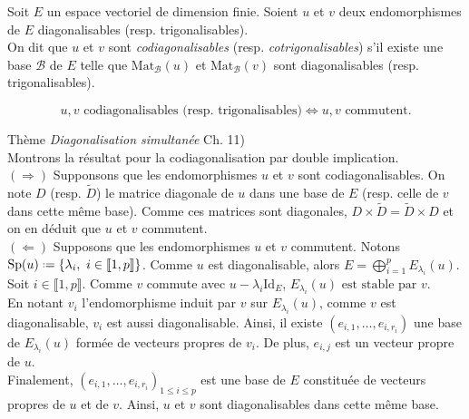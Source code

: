 \begin{defi}
    Soit $E$ un espace vectoriel de dimension finie. Soient $u$ et $v$ deux endomorphismes de $E$ diagonalisables (resp. trigonalisables). \\
    On dit que $u$ et $v$ sont \emph{codiagonalisables} (resp. \emph{cotrigonalisables}) s'il existe une base $\mathscr{B}$ de $E$ telle que $\mathrm{Mat}_\mathscr{B}(u)$ et $\mathrm{Mat}_\mathscr{B}(v)$ sont diagonalisables (resp. trigonalisables). 
\end{defi}

\begin{prop}
    $$u, v \text{ codiagonalisables (resp. trigonalisables)} \Longleftrightarrow u, v \text{ commutent}.$$
\end{prop}

\begin{preuve} \cite{acamanes} Thème \emph{Diagonalisation simultanée} Ch. 11)\\
    Montrons la résultat pour la codiagonalisation par double implication. \\
    $(\Rightarrow)$ Supponsons que les endomorphismes $u$ et $v$ sont codiagonalisables. On note $D$ (resp. $\widetilde{D}$) le matrice diagonale de $u$ dans une base de $E$ (resp. celle de $v$ dans cette même base). Comme ces matrices sont diagonales, $D \times \widetilde{D} = \widetilde{D} \times D$ et on en déduit que $u$ et $v$ commutent. \\
    $(\Leftarrow)$ Supposons que les endomorphismes $u$ et $v$ commutent. Notons $\mathrm{Sp}(u) \defeq \{ \lambda_i,\ i \in \llbracket1, p \rrbracket \}$. Comme $u$ est diagonalisable, alors $E = \bigoplus\limits_{i = 1}^{p} E_{\lambda_i}(u)$. \\
    Soit $i \in \llbracket 1, p \rrbracket$. Comme $v$ commute avec $u - \lambda_i \mathrm{Id}_E$, $E_{\lambda_i}(u) \text{ est stable par } v$. \\
    En notant $v_i$ l'endomorphisme induit par $v$ sur $E_{\lambda_i}(u)$, comme $v$ est diagonalisable, $v_i$ est aussi diagonalisable. Ainsi, il existe $(e_{i, 1}, \dots, e_{i, r_i})$ une base de $E_{\lambda_i}(u)$ formée de vecteurs propres de $v_i$. De plus, $e_{i, j}$ est un vecteur propre de $u$. \\
    Finalement, $(e_{i, 1}, \dots, e_{i, r_i})_{1 \leqslant i \leqslant p}$ est une base de $E$ constituée de vecteurs propres de $u$ et de $v$. Ainsi, $u$ et $v$ sont diagonalisables dans cette même base. 
\end{preuve}


\marginnote[0cm]{
    \begin{kaobox}[frametitle=Endomorphisme induit]
    \end{kaobox}
}